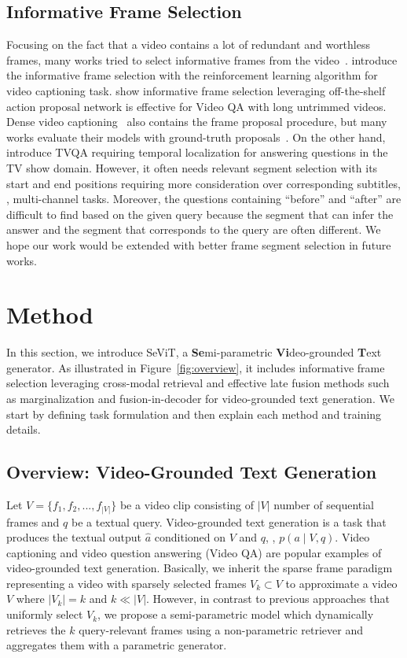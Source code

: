 \documentclass{article}
\newcommand{\frameworkname}{SeViT}
\begin{document}
\subsection{Informative Frame Selection}

Focusing on the fact that a video contains a lot of redundant and worthless frames, many works tried to select informative frames from the video~\cite{chen2018less, yu2019activitynet}. \citet{chen2018less} introduce the informative frame selection with the reinforcement learning algorithm for video captioning task. \citet{yu2019activitynet} show informative frame selection leveraging off-the-shelf action proposal network is effective for Video QA with long untrimmed videos. Dense video captioning~\cite{krishna2017dense, zhou2018towards} also contains the frame proposal procedure, but many works evaluate their models with ground-truth proposals~\cite{seo2022end}. On the other hand, \citet{lei2018tvqa} introduce TVQA requiring temporal localization for answering questions in the TV show domain. However, it often needs relevant segment selection with its start and end positions requiring more consideration over corresponding subtitles, \ie, multi-channel tasks. Moreover, the questions containing ``before'' and ``after'' are difficult to find based on the given query because the segment that can infer the answer and the segment that corresponds to the query are often different. We hope our work would be extended with better frame segment selection in future works.

%
 \section{Method}

In this section, we introduce \frameworkname{}, a \textbf{Se}mi-parametric \textbf{Vi}deo-grounded \textbf{T}ext generator. As illustrated in Figure~\ref{fig:overview}, it includes informative frame selection leveraging cross-modal retrieval and effective late fusion methods such as marginalization and fusion-in-decoder for video-grounded text generation.
We start by defining task formulation and then explain each method and training details.

\subsection{Overview: Video-Grounded Text Generation}

Let $V = \{f_1, f_2, ..., f_{|V|}\}$ be a video clip consisting of $|V|$ number of sequential frames and $q$ be a textual query. Video-grounded text generation is a task that produces the textual output $\hat{a}$ conditioned on $V$ and $q$, \ie, $p(a \mid V, q)$. Video captioning and video question answering (Video QA) are popular examples of video-grounded text generation. Basically, we inherit the sparse frame paradigm~\cite{lei2021less} representing a video with sparsely selected frames $V_k \subset V$ to approximate a video $V$ where $|V_k| = k$ and $k \ll |V|$. However, in contrast to previous approaches that uniformly select $V_k$, we propose a semi-parametric model which dynamically retrieves the $k$ query-relevant frames using a non-parametric retriever and aggregates them with a parametric generator.
\end{document}

